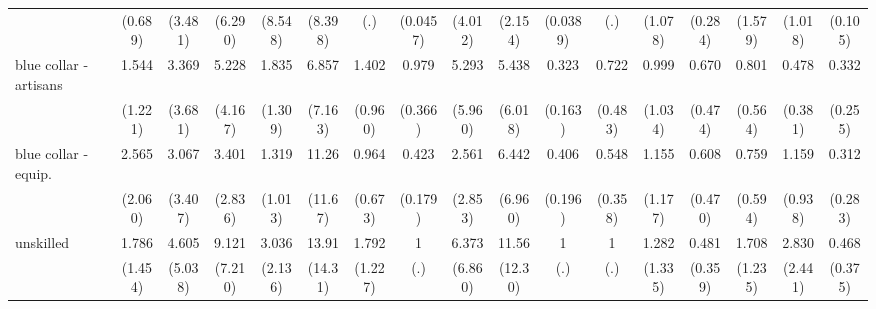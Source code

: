 {\begin{tabular}{l*{16}{c}}
                    &     (0.689)         &     (3.481)         &     (6.290)         &     (8.548)         &     (8.398)         &         (.)         &    (0.0457)         &     (4.012)         &     (2.154)         &    (0.0389)         &         (.)         &     (1.078)         &     (0.284)         &     (1.579)         &     (1.018)         &     (0.105)         \\
[1em]
blue collar - artisans&       1.544         &       3.369         &       5.228\sym{*}  &       1.835         &       6.857         &       1.402         &       0.979         &       5.293         &       5.438         &       0.323\sym{*}  &       0.722         &       0.999         &       0.670         &       0.801         &       0.478         &       0.332         \\
                    &     (1.221)         &     (3.681)         &     (4.167)         &     (1.309)         &     (7.163)         &     (0.960)         &     (0.366)         &     (5.960)         &     (6.018)         &     (0.163)         &     (0.483)         &     (1.034)         &     (0.474)         &     (0.564)         &     (0.381)         &     (0.255)         \\
[1em]
blue collar - equip.&       2.565         &       3.067         &       3.401         &       1.319         &       11.26\sym{*}  &       0.964         &       0.423\sym{*}  &       2.561         &       6.442         &       0.406         &       0.548         &       1.155         &       0.608         &       0.759         &       1.159         &       0.312         \\
                    &     (2.060)         &     (3.407)         &     (2.836)         &     (1.013)         &     (11.67)         &     (0.673)         &     (0.179)         &     (2.853)         &     (6.960)         &     (0.196)         &     (0.358)         &     (1.177)         &     (0.470)         &     (0.594)         &     (0.938)         &     (0.283)         \\
[1em]
unskilled           &       1.786         &       4.605         &       9.121\sym{**} &       3.036         &       13.91\sym{*}  &       1.792         &           1         &       6.373         &       11.56\sym{*}  &           1         &           1         &       1.282         &       0.481         &       1.708         &       2.830         &       0.468         \\
                    &     (1.454)         &     (5.038)         &     (7.210)         &     (2.136)         &     (14.31)         &     (1.227)         &         (.)         &     (6.860)         &     (12.30)         &         (.)         &         (.)         &     (1.335)         &     (0.359)         &     (1.235)         &     (2.441)         &     (0.375)         \\

\end{tabular}}
